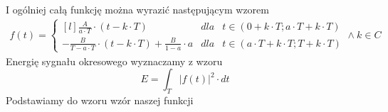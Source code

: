 I ogólniej całą funkcję można wyrazić następującym wzorem
\begin{align*}
f(t) = \left\{\begin{matrix*}[l]
\frac{A}{a \cdot T}\cdot \left( t - k\cdot T \right) & dla &t \in (0 + k\cdot T; a \cdot T + k\cdot T)\\ 
-\frac{B}{T - a \cdot T}\cdot \left( t - k\cdot T \right) + \frac{B}{1 - a} \cdot a & dla & t \in (a \cdot T+ k\cdot T; T+ k\cdot T)
\end{matrix*}\right. \wedge k \in C
\end{align*}
Energię sygnału okresowego wyznaczamy z wzoru
\begin{equation}
E=\int_{T}^{}\left|f(t)\right|^2 \cdot dt
\end{equation}
Podstawiamy do wzoru wzór naszej funkcji
